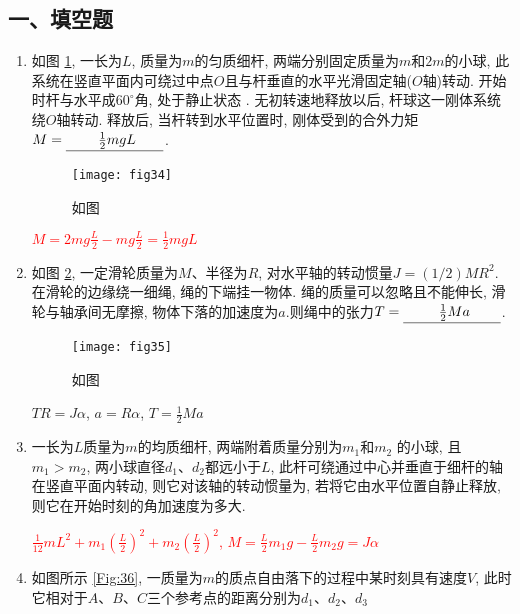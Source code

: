 \subsection*{一、填空题}
\begin{enumerate}
    \item 如图 \ref{Fig:34}, 一长为$L$, 质量为$m$的匀质细杆, 两端分别固定质量为$m$和$2m$的小球,
    此系统在竖直平面内可绕过中点$O$且与杆垂直的水平光滑固定轴($O$轴)转动. 
    开始时杆与水平成$60^\circ$角, 处于静止状态 . 
    无初转速地释放以后, 杆球这一刚体系统绕$O$轴转动. 
    释放后, 当杆转到水平位置时, 刚体受到的合外力矩$M=\anl{$\frac{1}{2}mgL$}$.
    \begin{figure}[H]
        \centering
        \texttt{[image: fig34]}
            \caption{如图}\label{Fig:34}
    \end{figure}
    \begin{note}
        \textcolor{red}{$M=2mg\frac{L}{2}-mg\frac{L}{2}=\frac{1}{2}mgL$}
    \end{note}
    \item 如图 \ref{Fig:35}, 一定滑轮质量为$M$、半径为$R$, 对水平轴的转动惯量$J=(1/2)MR^2$.
    在滑轮的边缘绕一细绳, 绳的下端挂一物体. 
    绳的质量可以忽略且不能伸长, 滑轮与轴承间无摩擦, 
    物体下落的加速度为$a$.则绳中的张力$T=\anl{$\frac{1}{2}Ma$}$.
    \begin{figure}[H]
        \centering
        \texttt{[image: fig35]}
            \caption{如图}\label{Fig:35}
    \end{figure}
    \begin{note}
        $TR=J\alpha$, $a=R\alpha$, $T=\frac{1}{2}Ma$
    \end{note}
    \item 一长为$L$质量为$m$的均质细杆, 两端附着质量分别为$m_1$和$m_2$
    的小球, 且$m_1>m_2$, 两小球直径$d_1$、$d_2$都远小于$L$, 
    此杆可绕通过中心并垂直于细杆的轴在竖直平面内转动, 
    则它对该轴的转动惯量为\underline{}, 若将它由水平位置自静止释放, 
    则它在开始时刻的角加速度为多大\underline{}.
    \begin{note}
        \textcolor{red}{$\frac{1}{12}mL^2+m_1(\frac{L}{2})^2+m_2(\frac{L}{2})^2$, $M=\frac{L}{2}m_1g-\frac{L}{2}m_2g=J\alpha$}
    \end{note}
    \item 如图所示 \ref{Fig:36}, 一质量为$m$的质点自由落下的过程中某时刻具有速度$V$,
    此时它相对于$A$、$B$、$C$三个参考点的距离分别为$d_1、d_2、d_3$

\end{enumerate}
